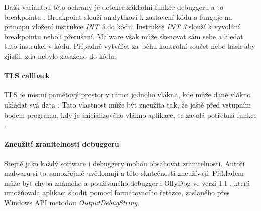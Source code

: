 Další variantou této ochrany je detekce základní funkce debuggeru a to breakpointu \cite{deepinstrinct_antidebug}. Breakpoint slouží analytikovi k zastavení kódu a funguje na principu vložení instrukce \emph{INT 3} do kódu. Instrukce \emph{INT 3} slouží k vyvolání breakpointu neboli přerušení. Malware však může skenovat sám sebe a hledat tuto instrukci v kódu. Případně vytvářet za~běhu kontrolní součet nebo hash aby zjistil, zda nebylo zasaženo do kódu.


\paragraph*{TLS callback}
TLS je místní paměťový prostor v rámci jednoho vlákna, kde může dané vlákno ukládat svá data \cite{msdocs_tls}. Tato vlastnost může být zneužita tak, že ještě před vstupním bodem programu, kdy je inicializováno vlákno aplikace, se zavolá potřebná funkce \cite{deepinstrinct_antidebug}.


\paragraph*{Zneužití zranitelnosti debuggeru}
Stejně jako každý software i debuggery mohou obsahovat zranitelnosti. Autoři malwaru si to samozřejmě uvědomují a této skutečnosti zneužívají. Příkladem může být chyba známého a používaného debuggeru OllyDbg ve verzi 1.1 \cite{CVE-2004-0733}, která umožňovala aplikaci shodit pomocí formátovacího řetězce, zaslaného přes Windows API metodou \emph{OutputDebugString}.
